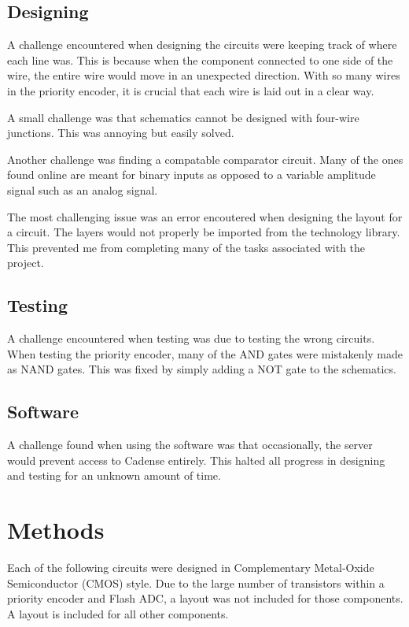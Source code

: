 \documentclass[conference]{IEEEtran}
\begin{document}
\subsection{Designing}

A challenge encountered when designing the circuits were keeping track of where each line was. This is because when the component connected to one side of the wire, the entire wire would move in an unexpected direction. With so many wires in the priority encoder, it is crucial that each wire is laid out in a clear way.

A small challenge was that schematics cannot be designed with four-wire junctions. This was annoying but easily solved.

Another challenge was finding a compatable comparator circuit. Many of the ones found online are meant for binary inputs as opposed to a variable amplitude signal such as an analog signal.

The most challenging issue was an error encoutered when designing the layout for a circuit. The layers would not properly be imported from the technology library. This prevented me from completing many of the tasks associated with the project.

\subsection{Testing}

A challenge encountered when testing was due to testing the wrong circuits. When testing the priority encoder, many of the AND gates were mistakenly made as NAND gates. This was fixed by simply adding a NOT gate to the schematics.

\subsection{Software}

A challenge found when using the software was that occasionally, the server would prevent access to Cadense entirely. This halted all progress in designing and testing for an unknown amount of time.

\section{Methods}\label{AA}

Each of the following circuits were designed in Complementary Metal-Oxide Semiconductor (CMOS) style. Due to the large number of transistors within a priority encoder and Flash ADC, a layout was not included for those components. A layout is included for all other components.  
\end{document}
